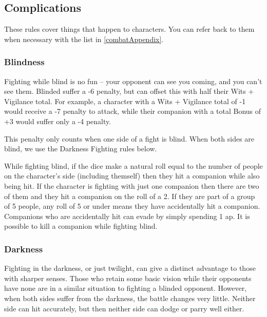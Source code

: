 \begin{multicols}{2}

\subsection{Complications}

These rules cover things that happen to characters.
You can refer back to them when necessary with the list in \autoref{combatAppendix}.

\subsubsection[Blindness: Roll at -6 penalty, + (Wits + Vigilance)/ 2]{Blindness}

Fighting while blind is no fun -- your opponent can see you coming, and you can't see them.
Blinded suffer a -6 penalty, but can offset this with half their Wits + Vigilance total.
For example, a character with a Wits + Vigilance total of -1 would receive a -7 penalty to attack, while their companion with a total Bonus of +3 would suffer only a -4 penalty.

This penalty only counts when one side of a fight is blind. When both sides are blind, we use the Darkness Fighting rules below.

While fighting blind, if the dice make a \gls{natural} roll equal to the number of people on the character's side (including themself) then they hit a companion while also being hit.
If the character is fighting with just one companion then there are two of them and they hit a companion on the roll of a 2.
If they are part of a group of 5 people, any roll of 5 or under means they have accidentally hit a companion.
Companions who are accidentally hit can evade by simply spending 1 \gls{ap}.
It is possible to kill a companion while fighting blind.

\null
\subsubsection[Darkness: Roll Bonus cannot exceed Wits + Vigilance]{Darkness}
\label{darkness}

Fighting in the darkness, or just twilight, can give a distinct advantage to those with sharper senses.
Those who retain some basic vision while their opponents have none are in a similar situation to fighting a blinded opponent.
However, when both sides suffer from the darkness, the battle changes very little.
Neither side can hit accurately, but then neither side can dodge or parry well either.


\end{multicols}
